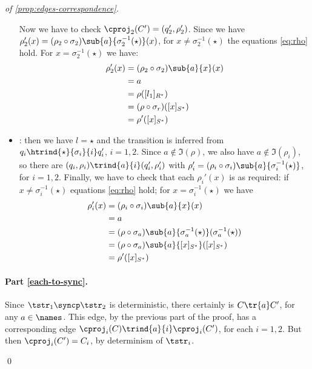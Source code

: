 \begin{proof}[of \cref{prop:edges-correspondence}]
\begin{itemize}
\begin{itemize}
	\end{itemize}
	Now we have to check $\cproj_2(C') = (q_2',\rho_2')$. Since we have $\rho'_2(x) = (\rho_2 \circ \sigma_2)\sub{a}{\sigma_2^{-1}(\star)}(x)$, for $x \neq \sigma_2^{-1}(\star)$ the equations \eqref{eq:rho} hold. For $x =  \sigma_2^{-1}(\star)$ we have:
	\begin{align*}
		\rho'_2(x) &= (\rho_2 \circ \sigma_2)\sub{a}{x}(x) \\
		&= a \\
		&= \rho([l_1]_{R^*}) \\
		&= (\rho \circ \sigma_r)([x]_{S^*}) \\
		& = \rho'([x]_{S^*})
	\end{align*}	



	\item \allrule: then we have $l=\star$ and the transition is inferred from $q_i \htrind{\star}{\sigma_i}{i} q_i'$, $i=1,2$. Since $a \notin \Im(\rho)$, we also have $a \notin \Im(\rho_i)$, so there are $(q_i,\rho_i) \trind{a}{i} (q_i',\rho_i')$ with $\rho_i' = (\rho_i \circ \sigma_i)\sub{a}{\sigma^{-1}_i(\star)}$, for $i=1,2$. Finally, we have to check that each $\rho_i'(x)$ is as required: if $x \neq\sigma_i^{-1}(\star)$ equations \eqref{eq:rho} hold; for $x=\sigma_i^{-1}(\star)$ we have
	\begin{align*}
		\rho'_i(x) &= (\rho_i \circ \sigma_i)\sub{a}{x}(x) \\
		&= a \\
		&= (\rho \circ \sigma_a) \sub{a}{\sigma_a^{-1}(\star)}(\sigma_a^{-1}(\star)) \\
		&= (\rho \circ \sigma_a) \sub{a}{[x]_{S^*}}([x]_{S^*}) \\
&= \rho'([x]_{S^*})
	\end{align*}
	
\end{itemize} 


\paragraph{Part \eqref{each-to-sync}.} 
Since $\tstr_1 \syncp \tstr_2$ is deterministic, there certainly is $C \tr{a} C'$, for any $a \in \names$. This edge, by the previous part of the proof, has a corresponding edge $\cproj_i(C) \trind{a}{i} \cproj_i(C')$, for each $i=1,2$. But then $\cproj_i(C') = C_i$, by determinism of $\tstr_i$.


\qed
\end{proof}

